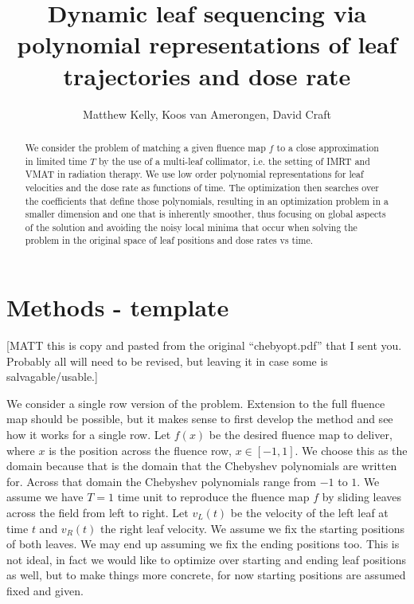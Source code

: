\documentclass[12pt]{article}
\title{Dynamic leaf sequencing via polynomial representations of leaf trajectories and dose rate}
\author{Matthew Kelly, Koos van Amerongen, David Craft}
\affil[]{Department of Radiation Oncology, Massachusetts General Hospital, Harvard Medical School}
\begin{document}
\maketitle
\thispagestyle{empty}



\begin{abstract}
  We consider the problem of matching a given fluence map $f$ to a close approximation in limited time $T$ by the use
  of a multi-leaf collimator, i.e. the setting of IMRT and VMAT in radiation therapy. We use low order polynomial
  representations for leaf velocities and the dose rate as functions of time. The optimization then searches over the coefficients
  that define those polynomials, resulting in an optimization problem in a smaller dimension and one that is inherently smoother,
  thus focusing on global aspects of the solution and avoiding the noisy local minima that occur when solving the problem in the original
  space of leaf positions and dose rates vs time.
\end{abstract}






\section{Methods - template}

[MATT this is copy and pasted from the original ``chebyopt.pdf'' that I sent you. Probably all will need to be revised, but leaving it in case some is salvagable/usable.]

We consider a single row version of the problem. Extension to the full fluence map should be possible, but it makes sense
to first develop the method and see how it works for a single row. Let $f(x)$ be the desired fluence map to deliver, where
$x$ is the position across the fluence row, $x \in [-1,1]$. We choose this as the domain because that is the
domain that the Chebyshev polynomials are written for. Across that domain the Chebyshev polynomials range from $-1$ to $1$.
We assume we have $T=1$ time unit to reproduce the fluence map $f$ by sliding leaves across the field from left to right.
Let $v_L(t)$ be the velocity of the left leaf at time $t$ and $v_R(t)$ the right leaf velocity. We assume we fix the starting positions
of both leaves. We may end up assuming we fix the ending positions too. This is not ideal, in fact we would like to optimize over
starting and ending leaf positions as well, but to make things more concrete, for now starting positions are assumed fixed and given.
\end{document}
